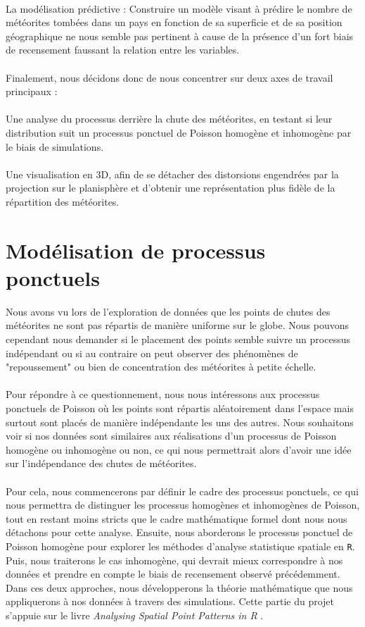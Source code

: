 \documentclass[12pt]{article}
\begin{document}
\\
La modélisation prédictive : Construire un modèle visant à prédire le nombre de météorites tombées dans un pays en fonction de sa superficie et de sa position géographique ne nous semble pas pertinent à cause de la présence d’un fort biais de recensement faussant la relation entre les variables.\\
\\
Finalement, nous décidons donc de nous concentrer sur deux axes de travail principaux :\\
\\
Une analyse du processus derrière la chute des météorites, en testant si leur distribution suit un processus ponctuel de Poisson homogène et inhomogène par le biais de simulations.\\
\\
Une visualisation en 3D, afin de se détacher des distorsions engendrées par la projection sur le planisphère et d’obtenir une représentation plus fidèle de la répartition des météorites.\\

\section{Modélisation de processus ponctuels}
Nous avons vu lors de l'exploration de données que les points de chutes des météorites ne sont pas répartis de manière uniforme sur le globe. Nous pouvons cependant nous demander si le placement des points semble suivre un processus indépendant ou si au contraire on peut observer des phénomènes de "repoussement" ou bien de concentration des météorites à petite échelle.\\
\\
Pour répondre à ce questionnement, nous nous intéressons aux processus ponctuels de Poisson où les points sont répartis aléatoirement dans l'espace mais surtout sont placés de manière indépendante les uns des autres. Nous souhaitons voir si nos données sont similaires aux réalisations d'un processus de Poisson homogène ou inhomogène ou non, ce qui nous permettrait alors d'avoir une idée sur l'indépendance des chutes de météorites.\\
\\
Pour cela, nous commencerons par définir le cadre des processus ponctuels, ce qui nous permettra de distinguer les processus homogènes et inhomogènes de Poisson, tout en restant moins stricts que le cadre mathématique formel dont nous nous détachons pour cette analyse. Ensuite, nous aborderons le processus ponctuel de Poisson homogène pour explorer les méthodes d'analyse statistique spatiale en \texttt{R}. Puis, nous traiterons le cas inhomogène, qui devrait mieux correspondre à nos données et prendre en compte le biais de recensement observé précédemment. Dans ces deux approches, nous développerons la théorie mathématique que nous appliquerons à nos données à travers des simulations. Cette partie du projet s'appuie sur le livre \textit{Analysing Spatial Point Patterns in R} \cite{analysing_spacial_points}.
\end{document}
